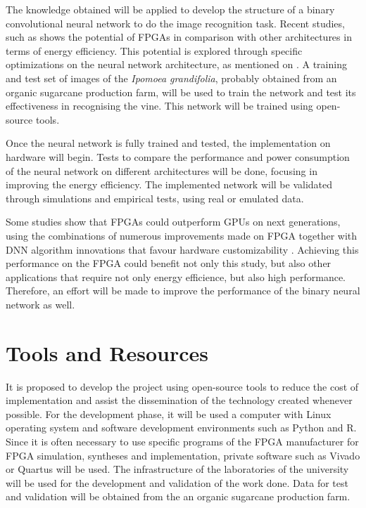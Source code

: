 \documentclass[
	12pt,				%
	oneside,			%
	a4paper,			%
	brazil,			    %
	french,				%
	spanish,			%
	english,			%
	]{abntex2}
\begin{document}
The knowledge obtained will be applied to develop the structure of a binary convolutional neural network to do the image recognition task. Recent studies, such as  shows the potential of FPGAs in comparison with other architectures in terms of energy efficiency. This potential is explored through specific optimizations on the neural network architecture, as mentioned on . A training and test set of images of the \textit{Ipomoea grandifolia}, probably obtained from an organic sugarcane production farm, will be used to train the network and test its effectiveness in recognising the vine. This network will be trained using open-source tools.

Once the neural network is fully trained and tested, the implementation on hardware will begin. Tests to compare the performance and power consumption of the neural network on different architectures will be done, focusing in improving the energy efficiency. The implemented network will be validated through simulations and empirical tests, using real or emulated data.

Some studies show that FPGAs could outperform GPUs on next generations, using the combinations of numerous improvements made on FPGA together with DNN algorithm innovations that favour hardware customizability \cite{Nurvitadhi2017_1}. Achieving this performance on the FPGA could benefit not only this study, but also other applications that require not only energy efficience, but also high performance. Therefore, an effort will be made to improve the performance of the binary neural network as well.

\section{Tools and Resources}

  It is proposed to develop the project using open-source tools to reduce the cost of implementation and assist the dissemination of the technology created whenever possible. For the development phase, it will be used a computer with Linux operating system and software development environments such as Python and R. Since it is often necessary to use specific programs of the FPGA manufacturer for FPGA simulation, syntheses and implementation, private software such as Vivado or Quartus will be used. The infrastructure of the laboratories of the university will be used for the development and validation of the work done. Data for test and validation will be obtained from the an organic sugarcane production farm.
\end{document}
